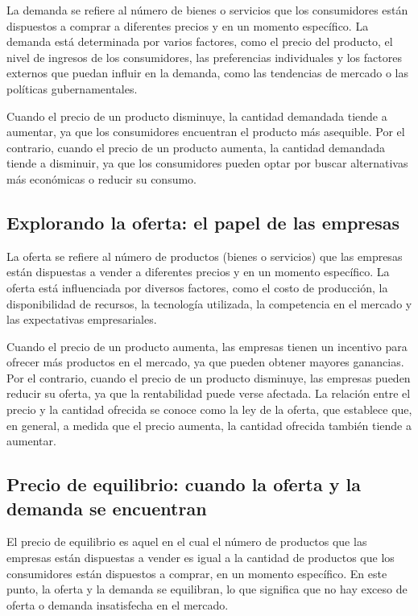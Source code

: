 \documentclass[
  letterpaper,
  DIV=11,
  numbers=noendperiod]{scrartcl}
\begin{document}
La demanda se refiere al número de bienes o servicios que los
consumidores están dispuestos a comprar a diferentes precios y en un
momento específico. La demanda está determinada por varios factores,
como el precio del producto, el nivel de ingresos de los consumidores,
las preferencias individuales y los factores externos que puedan influir
en la demanda, como las tendencias de mercado o las políticas
gubernamentales.

Cuando el precio de un producto disminuye, la cantidad demandada tiende
a aumentar, ya que los consumidores encuentran el producto más
asequible. Por el contrario, cuando el precio de un producto aumenta, la
cantidad demandada tiende a disminuir, ya que los consumidores pueden
optar por buscar alternativas más económicas o reducir su consumo.

\hypertarget{explorando-la-oferta-el-papel-de-las-empresas}{%
\subsection{Explorando la oferta: el papel de las
empresas}\label{explorando-la-oferta-el-papel-de-las-empresas}}

La oferta se refiere al número de productos (bienes o servicios) que las
empresas están dispuestas a vender a diferentes precios y en un momento
específico. La oferta está influenciada por diversos factores, como el
costo de producción, la disponibilidad de recursos, la tecnología
utilizada, la competencia en el mercado y las expectativas
empresariales.

Cuando el precio de un producto aumenta, las empresas tienen un
incentivo para ofrecer más productos en el mercado, ya que pueden
obtener mayores ganancias. Por el contrario, cuando el precio de un
producto disminuye, las empresas pueden reducir su oferta, ya que la
rentabilidad puede verse afectada. La relación entre el precio y la
cantidad ofrecida se conoce como la ley de la oferta, que establece que,
en general, a medida que el precio aumenta, la cantidad ofrecida también
tiende a aumentar.

\hypertarget{precio-de-equilibrio-cuando-la-oferta-y-la-demanda-se-encuentran}{%
\subsection{Precio de equilibrio: cuando la oferta y la demanda se
encuentran}\label{precio-de-equilibrio-cuando-la-oferta-y-la-demanda-se-encuentran}}

El precio de equilibrio es aquel en el cual el número de productos que
las empresas están dispuestas a vender es igual a la cantidad de
productos que los consumidores están dispuestos a comprar, en un momento
específico. En este punto, la oferta y la demanda se equilibran, lo que
significa que no hay exceso de oferta o demanda insatisfecha en el
mercado.
\end{document}
